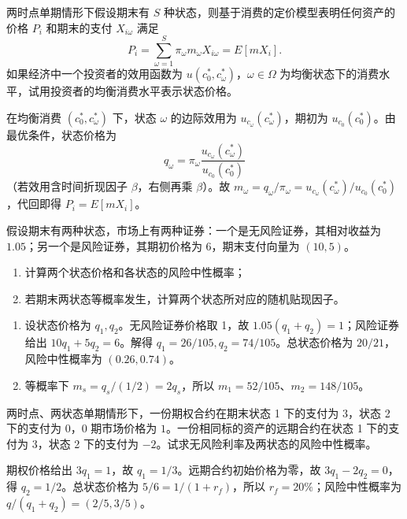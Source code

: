 \begin{problem}
 两时点单期情形下假设期末有 $S$ 种状态，则基于消费的定价模型表明任何资产的价格 $P_i$ 和期末的支付 $X_{i\omega}$ 满足
\[
    P_i=\sum_{\omega=1}^{S}\pi_\omega m_\omega X_{i\omega}=E[mX_i].
\]
如果经济中一个投资者的效用函数为 $u(c_0^*,c_\omega^*)$，$\omega\in\Omega$ 为均衡状态下的消费水平，试用投资者的均衡消费水平表示状态价格。
\end{problem}
\begin{solution}
在均衡消费 $(c_0^*,c_\omega^*)$ 下，状态 $\omega$ 的边际效用为 $u_{c_\omega}(c_\omega^*)$，期初为 $u_{c_0}(c_0^*)$。由最优条件，状态价格为
\[
q_\omega=\pi_\omega\frac{u_{c_\omega}(c_\omega^*)}{u_{c_0}(c_0^*)}
\]
（若效用含时间折现因子 $\beta$，右侧再乘 $\beta$）。故 $m_\omega=q_\omega/\pi_\omega=u_{c_\omega}(c_\omega^*)/u_{c_0}(c_0^*)$，代回即得 $P_i=E[mX_i]$。
\end{solution}
\begin{problem}
 假设期末有两种状态，市场上有两种证券：一个是无风险证券，其相对收益为 $1.05$；另一个是风险证券，其期初价格为 $6$，期末支付向量为 $(10,5)$。
\begin{enumerate}[label=(\alph*)]
    \item 计算两个状态价格和各状态的风险中性概率；
    \item 若期末两状态等概率发生，计算两个状态所对应的随机贴现因子。
\end{enumerate}
\end{problem}
\begin{solution}
\begin{enumerate}[label=(\alph*)]
\item 设状态价格为 $q_1,q_2$。无风险证券价格取 1，故 $1.05(q_1+q_2)=1$；风险证券给出 $10q_1+5q_2=6$。解得 $q_1=26/105,q_2=74/105$。总状态价格为 $20/21$，风险中性概率为 $(0.26,0.74)$。
\item 等概率下 $m_s=q_s/(1/2)=2q_s$，所以 $m_1=52/105$、$m_2=148/105$。
\end{enumerate}
\end{solution}
\begin{problem}
 两时点、两状态单期情形下，一份期权合约在期末状态 1 下的支付为 $3$，状态 2 下的支付为 $0$，0 期市场价格为 $1$。一份相同标的资产的远期合约在状态 1 下的支付为 $3$，状态 2 下的支付为 $-2$。试求无风险利率及两状态的风险中性概率。
\end{problem}
\begin{solution}
期权价格给出 $3q_1=1$，故 $q_1=1/3$。远期合约初始价格为零，故 $3q_1-2q_2=0$，得 $q_2=1/2$。总状态价格为 $5/6=1/(1+r_f)$，所以 $r_f=20\%$；风险中性概率为 $q/(q_1+q_2)=(2/5,3/5)$。
\end{solution}

